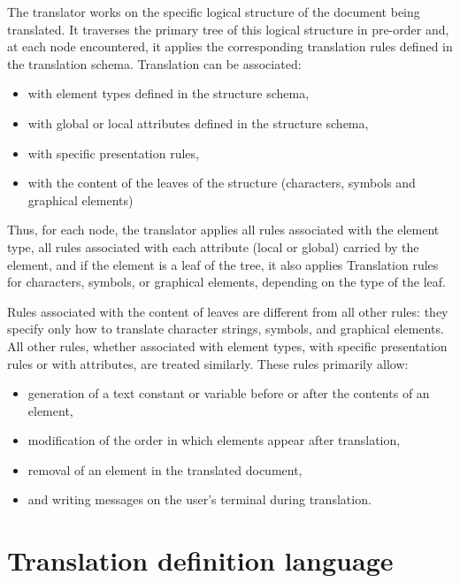 The translator works on the specific logical structure of the document
being translated.  It traverses the primary tree of this logical
structure in pre-order and, at each node encountered, it applies the
corresponding translation rules defined in the translation schema.
Translation can be associated:
\begin{itemize}
\item with element types defined in the structure schema,

\item with global or local attributes defined in the structure schema,

\item with specific presentation rules,

\item with the content of the leaves of  the structure (characters,
symbols and graphical elements)

\end{itemize}

Thus, for each node, the translator applies all rules associated with
the element type, all rules associated with each attribute (local or
global) carried by the element, and if the element is a leaf of the
tree, it also applies Translation rules for characters, symbols, or
graphical elements, depending on the type of the leaf.

Rules associated with the content of leaves are different from all
other rules: they specify only how to translate character strings,
symbols, and graphical elements.  All other rules, whether associated
with element types, with specific presentation rules or with
attributes, are treated similarly.  These rules primarily allow:
\begin{itemize}
\item generation of a text constant or variable before or after
the contents of an element,

\item modification of the order in which elements appear after
translation,

\item removal of an element in the translated document,

\item and writing messages on the user's terminal during translation.
\end{itemize}

\section{Translation definition language}

